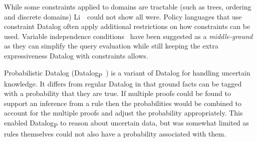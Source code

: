 \documentclass[thesis.tex]{subfiles}
\begin{document}
While some constraints applied to domains are tractable (such as
trees, ordering and discrete domains) Li~\etal{}~could not show
all were.  Policy languages that use constraint Datalog often apply
additional restrictions on how constraints can be used.  Variable independence
conditions~\cite{chomicki_variable_2003} have been suggested as a \emph{middle-ground}
as they can simplify the query evaluation while still keeping the extra
expressiveness Datalog with constraints allows.

Probabilistic Datalog
(Datalog\textsubscript{P}~\cite{fuhr_probabilistic_1995}) is a variant
of Datalog for handling uncertain knowledge.  It differs from regular
Datalog in that ground facts can be tagged with a probability that
they are true.  If multiple proofs could be found to support an
inference from a rule then the probabilities would be combined to
account for the multiple proofs and adjust the probability
appropriately. This enabled Datalog\textsubscript{P} to reason about
uncertain data, but was somewhat limited as rules themselves could not
also have a probability associated with them.
\end{document}

